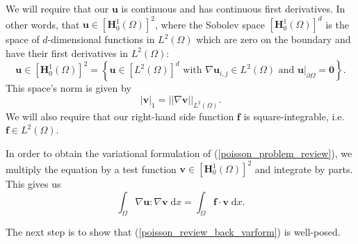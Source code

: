\documentclass[12pt,a4paper]{article}
\theoremstyle{definition}
\begin{document}
We will require that our $\textbf{u}$ is continuous and has continuous first derivatives. 
 In other words, that $\textbf{u}\in \left[\textbf{H}^1_0\left(\Omega\right)\right]^2$, where the Sobolev space $\left[\textbf{H}^1_0\left(\Omega\right)\right]^d$ is  the space of $d$-dimensional functions in $L^2\left(\Omega\right)$ which are zero on the boundary and have their first derivatives in $L^2\left(\Omega\right)$:
\begin{equation}
\textbf{u}\in \left[\textbf{H}^1_0\left(\Omega\right)\right]^2 = \left\lbrace \textbf{u}\in \left[L^2\left(\Omega\right)\right]^d \text{ with } \nabla\textbf{u}_{i,j}\in L^2\left(\Omega\right) \text{ and } \textbf{u}|_{\partial\Omega}=\textbf{0}\right\rbrace. \nonumber
\end{equation}
This space's norm is given by 
\begin{equation}
\left|\textbf{v}\right|_{1}=\left|\left|\nabla\textbf{v}\right|\right|_{L^2\left(\Omega\right)}.\nonumber
\end{equation}
 We will also require that our right-hand side function $\textbf{f}$ is square-integrable, i.e. $\textbf{f}\in L^2\left(\Omega\right)$.
 
In order to obtain the variational formulation of (\ref{poisson_problem_review}), we multiply the equation by a test function $\textbf{v}\in \left[\textbf{H}^1_0\left(\Omega\right)\right]^2$ and integrate by parts.  This gives us
\begin{equation}
\int_{\Omega}\nabla \textbf{u} : \nabla \textbf{v}\;\mathrm{d}x  =\int_{\Omega}\textbf{f}\cdot \textbf{v} \;\mathrm{d}x.
\end{equation}

The next step is to show that (\ref{poisson_review_back_varform}) is well-posed.
\end{document}
